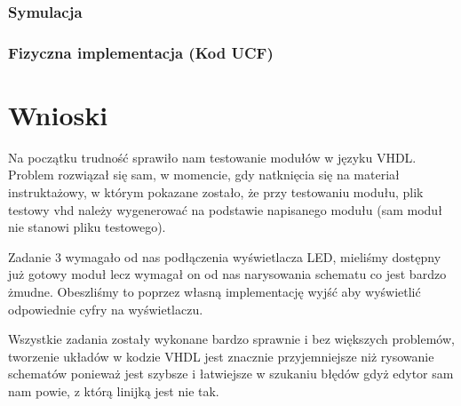 \documentclass[a4paper,12pt]{extarticle}  %
\begin{document}
\subsubsection{Symulacja}
\begin{figure}[H]
   \centering
\end{figure}
\subsubsection{Fizyczna implementacja (Kod UCF)}


\section{Wnioski}

Na początku trudność sprawiło nam testowanie modułów w języku VHDL. 
Problem rozwiązał się sam, w momencie, gdy natknięcia się na materiał instruktażowy, 
w którym pokazane zostało, że przy testowaniu modułu, plik testowy vhd należy wygenerować 
na podstawie napisanego modułu (sam moduł nie stanowi pliku testowego).

Zadanie 3 wymagało od nas podłączenia wyświetlacza LED, mieliśmy dostępny już gotowy moduł lecz wymagał
on od nas narysowania schematu co jest bardzo żmudne.
Obeszliśmy to poprzez własną implementację wyjść aby wyświetlić odpowiednie cyfry na wyświetlaczu.

Wszystkie zadania zostały wykonane bardzo sprawnie i bez większych problemów, tworzenie układów w kodzie VHDL jest znacznie przyjemniejsze niż rysowanie
schematów ponieważ jest szybsze i łatwiejsze w szukaniu błędów gdyż edytor sam nam powie, z którą linijką jest nie tak.
\end{document}
